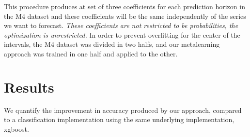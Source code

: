 \documentclass[11pt,a4paper,]{article}
\theoremstyle{definition}
\theoremstyle{definition}
\theoremstyle{definition}
\theoremstyle{remark}
\begin{document}
This procedure produces at set of three coefficients for each prediction
horizon in the M4 dataset and these coefficients will be the same
independently of the series we want to forecast. \emph{These
coefficients are not restricted to be probabilities, the optimization is
unrestricted.} In order to prevent overfitting for the center of the
intervals, the M4 dataset was divided in two halfs, and our metalearning
approach was trained in one half and applied to the other.

\section{Results}\label{results}

We quantify the improvement in accuracy produced by our approach,
compared to a classification implementation using the same underlying
implementation, xgboost.

\printbibliography[title=References]
\end{document}
